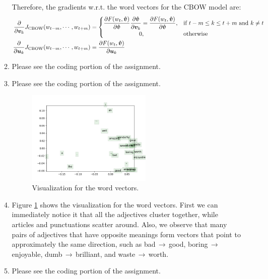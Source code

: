 \documentclass[10pt,reqno]{amsart}
\begin{document}
\begin{enumerate}[topsep=0pt,itemsep=3ex,partopsep=1ex,parsep=1ex]
\begin{enumerate}[itemsep=2ex]
    Therefore, the gradients w.r.t. the word vectors for the CBOW model are:
    \begin{align*}
      \frac{\partial}{\partial \bm{v}_k} J_\text{CBOW}(w_{t-m},\cdots,w_{t+m}) &= 
      \begin{cases}
        \displaystyle\frac{\partial F(w_t, \bm{\hat{v}})}{\partial \bm{\hat{v}}} \frac{\partial \bm{\hat{v}}}{\partial \bm{v}_k} 
        = \displaystyle\frac{\partial F(w_t, \bm{\hat{v}})}{\partial \bm{\hat{v}}} , & \text{if}\ t-m \leq k \leq t+m\ \text{and}\ k \neq t\\
        \qquad\qquad\qquad 0, & \text{otherwise}
      \end{cases}\\
      \frac{\partial}{\partial \bm{u}_k} J_\text{CBOW}(w_{t-m},\cdots,w_{t+m}) 
      &= \frac{\partial F(w_t, \bm{\hat{v}})}{\partial \bm{u}_k} 
    \end{align*}
    
  \item Please see the coding portion of the assignment.
  \item Please see the coding portion of the assignment.
    \begin{figure}[h]
      \includegraphics[width=0.6\textwidth]{../code/q3_word_vectors.png}
      \caption{Visualization for the word vectors.}
      \label{fig1}
    \end{figure}
  \item
    Figure \ref{fig1} shows the visualization for the word vectors. 
    First we can immediately notice it that all the adjectives cluster together, 
    while articles and punctuations scatter around. 
    Also, we observe that many pairs of adjectives that have opposite meanings 
    form vectors that point to approximately the same direction, such as 
    bad$\,\to\,$good, 
    boring$\,\to\,$enjoyable,
    dumb$\,\to\,$brilliant, and
    waste$\,\to\,$worth.
  \item Please see the coding portion of the assignment.
  \end{enumerate}



\end{enumerate}
\end{document}
